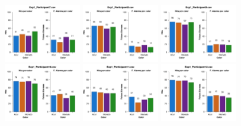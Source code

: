 \begin{figure}[th]
\includegraphics[width=0.30\textwidth]{Figures/Color_Exp1_P7} \includegraphics[width=0.30\textwidth]{Figures/Color_Exp1_P8} \includegraphics[width=0.30\textwidth]{Figures/Color_Exp1_P9}
\includegraphics[width=0.30\textwidth]{Figures/Color_Exp1_P10} \includegraphics[width=0.30\textwidth]{Figures/Color_Exp1_P11} \includegraphics[width=0.30\textwidth]{Figures/Color_Exp1_P12}

\end{figure}
